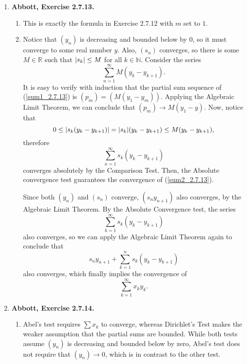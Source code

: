 \documentclass{article}
\DeclarePairedDelimiter\abs{\lvert}{\rvert}
\newcommand{\N}{\mathbb{N}}
\newcommand{\R}{\mathbb{R}}
\newcommand{\ra}{\rightarrow}
\newcommand{\exc}[2][Abbott]{\item \textbf{#1, Exercise #2.}}
\begin{document}
\begin{enumerate}
    \exc{2.7.13}
    \begin{enumerate}
        \item This is exactly the formula in Exercise 2.7.12 with $m$ set to $1$.
        
        \item Notice that $(y_n)$ is decreasing and bounded below by $0$, so it must converge to some real number $y$. Also, $(s_n)$ converges, so there is some $M \in \R$ such that $\abs*{s_k} \leq M$ for all $k \in \N$. Consider the series
        \begin{equation}\label{sum1_2.7.13}
            \sum_{n=1}^\infty M (y_k - y_{k+1}).
        \end{equation} It is easy to verify with induction that the partial sum sequence of (\ref{sum1_2.7.13}) is $(p_m) = (M(y_1-y_m))$. Applying the Algebraic Limit Theorem, we can conclude that $(p_m) \ra M(y_1-y)$. Now, notice that 
        \begin{equation*}
            0 \leq \abs*{s_k (y_k-y_{k+1})} = \abs*{s_k} (y_k-y_{k+1}) \leq 
            M (y_k-y_{k+1}),
        \end{equation*} therefore 
        \begin{equation} \label{sum2_2.7.13}
            \sum_{n=1}^\infty s_k (y_k-y_{k+1})
        \end{equation} converges absolutely by the Comparison Test. Then, the Absolute convergence test guarantees the convergence of (\ref{sum2_2.7.13}).
        
        Since both $(y_n)$ and $(s_n)$ converge, $(s_n y_{n+1})$ also converges, by the Algebraic Limit Theorem. By the Absolute Convergence test, the series 
        \begin{equation*}
            \sum_{k=1}^\infty s_k(y_k-y_{k+1})
        \end{equation*} also converges, so we can apply the Algebraic Limit Theorem again to conclude that 
        \begin{equation*}
           s_n y_{n+1} + \sum_{k=1}^n s_k(y_k-y_{k+1})
        \end{equation*} also converges, which finally implies the convergence of 
        \begin{equation*}
            \sum_{k=1}^\infty x_k y_k. 
        \end{equation*}
    \end{enumerate}
    
    \exc{2.7.14}
    \begin{enumerate}
        \item Abel's test requires $\sum x_k$ to converge, whereas Dirichlet's Test makes the weaker assumption that the partial sums are bounded. While both tests assume $(y_n)$ is decreasing and bounded below by zero, Abel's test does not require that $(y_n) \ra 0$, which is in contrast to the other test.
        

\end{enumerate}
\end{enumerate}
\end{document}
